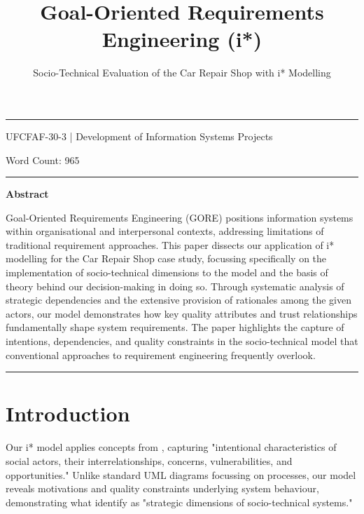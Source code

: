 \documentclass[14pt,a4paper]{article}
\title{Goal-Oriented Requirements Engineering (i*)}
\author{Socio-Technical Evaluation of the Car Repair Shop with i* Modelling}
\date{}
\begin{document}
\maketitle

\hrule

\vspace{3em}

UFCFAF-30-3 | Development of Information Systems Projects

Word Count: 965

\vspace{3em}
\hrule

\vspace{2em}

\textbf{\Large{Abstract}}
\vspace{1em}

Goal-Oriented Requirements Engineering (GORE) positions information systems within organisational and interpersonal contexts, addressing limitations of traditional requirement approaches. This paper dissects our application of i* modelling for the Car Repair Shop case study, focussing specifically on the implementation of socio-technical dimensions to the model and the basis of theory behind our decision-making in doing so. Through systematic analysis of strategic dependencies and the extensive provision of rationales among the given actors, our model demonstrates how key quality attributes and trust relationships fundamentally shape system requirements. The paper highlights the capture of intentions, dependencies, and quality constraints in the socio-technical model that conventional approaches to requirement engineering frequently overlook.

\vspace{3em}
\hrule

\thispagestyle{empty}

\tableofcontents
{}

\newpage


\section{Introduction}

Our i* model  applies concepts from \textit{\parencite[p. 127]{Yu2011}}, capturing "intentional characteristics of social actors, their interrelationships, concerns, vulnerabilities, and opportunities." Unlike standard UML diagrams focussing on processes, our model reveals motivations and quality constraints underlying system behaviour, demonstrating what \textit{\parencite[p. 342]{Dalpiaz2016}} identify as "strategic dimensions of socio-technical systems."
\end{document}
